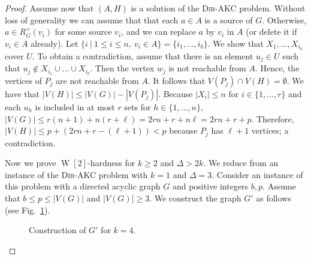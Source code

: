 \documentclass[11pt,a4paper]{article}
\DeclareMathOperator{\operatorClassW}{W}
\newcommand{\classW}[1]{\ensuremath{\operatorClassW[#1]}}
\newcommand{\DAKC}{\textsc{Dir-AKC}\xspace}
\begin{document}
\begin{proof}
Assume now that $(A,H)$ is a solution of the \DAKC problem. Without loss of generality we can assume that that each $a\in A$
is a source of $G$. Otherwise, $a\in R_G^+(v_i)$ for some source $v_i$, and we can replace $a$ by $v_i$ in $A$ (or delete it
if $v_i\in A$ already). Let $\{i\ |\ 1\leq i\leq n,~v_i\in A\}=\{i_1,\ldots,i_{b}\}$. We show that $X_1,\ldots,X_{i_{b}}$
cover $U$. To obtain a contradiction, assume that there is an element $u_j\in U$ such that $u_j\notin X_{i_1}\cup \ldots\cup
X_{i_{b}}$. Then the vertex $w_j$ is not reachable from $A$. Hence, the vertices of $P_j$ are not reachable from $A$. It
follows that $V(P_j)\cap V(H)=\emptyset$. We have that $|V(H)|\leq |V(G)|-|V(P_j)|$. Because $|X_i|\leq n$ for
$i\in\{1,\ldots,r\}$ and each $u_h$ is included in at most $r$ sets for $h\in\{1,\ldots,n\}$, $|V(G)|\leq
r(n+1)+n(r+\ell)=2rn+r+n \ell=2rn+r+p$. Therefore, $|V(H)|\leq p+(2rn+r-(\ell+1))<p$ because $P_j$ has $\ell+1$ vertices; a
contradiction.

Now we prove \classW{2}-hardness for $k\geq 2$ and $\Delta>2k$. We reduce from an instance of the \DAKC problem with $k=1$
and $\Delta=3$. Consider an instance of this problem with a directed acyclic graph $G$ and positive integers $b, p$. Assume
that $b\leq p\leq |V(G)|$ and $|V(G)|\geq 3$. We construct the graph $G'$ as follows (see Fig.~\ref{fig:W2h-2}).

\begin{figure}[ht]
\centering{}
\caption{Construction of $G'$ for $k=4$.
\label{fig:W2h-2}}
\end{figure}


\end{proof}
\end{document}
